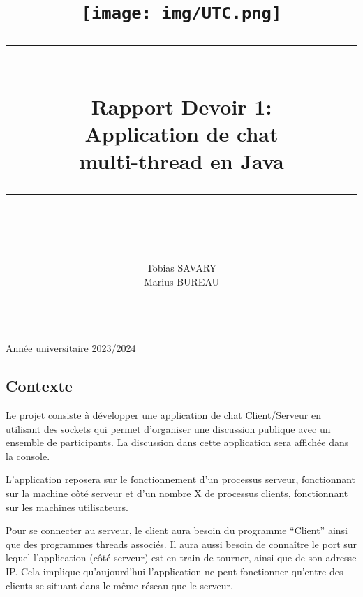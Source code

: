\documentclass[
]{article}
\newcommand{\HRule}[1]{\rule{\linewidth}{#1}}
\begin{document}
\title{ 
  \begin{center}
          \texttt{[image: img/UTC.png]} \\ [2cm]
  \end{center}
		\HRule{2pt} \\

		\LARGE \textbf{Rapport Devoir 1:\\Application de chat \\multi-thread en
    Java} 
		\HRule{2pt} \\ [5.5cm]


		\normalsize  
        \author{
            Tobias SAVARY \\[0.5cm]
            Marius BUREAU \\[0.5cm]
           \\[1cm]
        }
		}
		\maketitle
        \begin{center}
            Année universitaire 2023/2024
        \end{center}
\pagebreak

\tableofcontents

\pagebreak

\hypertarget{contexte}{%
\subsection{Contexte}\label{contexte}}

Le projet consiste à développer une application de chat Client/Serveur
en utilisant des sockets qui permet d'organiser une discussion publique
avec un ensemble de participants. La discussion dans cette application
sera affichée dans la console.

L'application reposera sur le fonctionnement d'un processus serveur,
fonctionnant sur la machine côté serveur et d'un nombre X de processus
clients, fonctionnant sur les machines utilisateurs.

Pour se connecter au serveur, le client aura besoin du programme
``Client'' ainsi que des programmes threads associés. Il aura aussi
besoin de connaître le port sur lequel l'application (côté serveur) est
en train de tourner, ainsi que de son adresse IP. Cela implique
qu'aujourd'hui l'application ne peut fonctionner qu'entre des clients se
situant dans le même réseau que le serveur.
\end{document}
